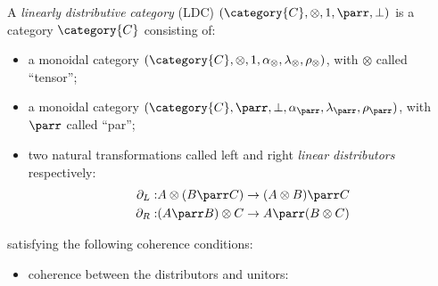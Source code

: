 \documentclass[DIN, pagenumber=false, fontsize=11pt, parskip=half, colorinlistoftodos, svgnames]{scrartcl}
\begin{document}
	\begin{definition}
		\label{def: linDisCat}
		A \emph{linearly} \emph{distributive} \emph{category} (LDC) $(\category{C}, \otimes, 1, \parr, \bot)$ is a category $\category{C}$ consisting of:
		\begin{itemize}
			\item a monoidal category $(\category{C}, \otimes, 1, \alpha_\otimes, \lambda_\otimes, \rho_\otimes)$, with $\otimes$ called “tensor”;
			\item a monoidal  category $(\category{C}, \parr, \bot, \alpha_\parr, \lambda_\parr, \rho_\parr)$, with $\parr$ called “par”;
			\item two natural transformations called left and right \emph{linear distributors} respectively:
			\begin{align*}
				\partial_L:& A \otimes (B \parr C) \rightarrow (A\otimes B) \parr C
				\\
				\partial_R:& (A \parr B) \otimes C \rightarrow A \parr (B \otimes C)
			\end{align*}
		\end{itemize}
		satisfying the following coherence conditions:
		\begin{itemize}
			\item 
				coherence between the distributors and unitors:
				\begin{center}
					

\end{center}
\end{itemize}
\end{definition}
\end{document}
